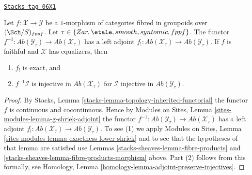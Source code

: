 \begin{lemma}
\label{stacks-sheaves-lemma-pullback-injective}
\href{https://stacks.math.columbia.edu/tag/06X1}{\texttt{Stacks tag 06X1}}

Let $f : \mathcal{X} \to \mathcal{Y}$ be a $1$-morphism of categories
fibred in groupoids over $(\Sch/S)_{fppf}$. Let
$\tau \in \{Zar, \etale, smooth, syntomic, fppf\}$.
The functor
$f^{-1} : \textit{Ab}(\mathcal{Y}_\tau) \to \textit{Ab}(\mathcal{X}_\tau)$
has a left adjoint
$f_! : \textit{Ab}(\mathcal{X}_\tau) \to \textit{Ab}(\mathcal{Y}_\tau)$.
If $f$ is faithful and $\mathcal{X}$ has equalizers, then
\begin{enumerate}
\item $f_!$ is exact, and
\item $f^{-1}\mathcal{I}$ is injective in $\textit{Ab}(\mathcal{X}_\tau)$
for $\mathcal{I}$ injective in $\textit{Ab}(\mathcal{Y}_\tau)$.
\end{enumerate}
\end{lemma}

\begin{proof}
By
Stacks, Lemma \ref{stacks-lemma-topology-inherited-functorial}
the functor $f$ is continuous and cocontinuous. Hence by
Modules on Sites, Lemma \ref{sites-modules-lemma-g-shriek-adjoint}
the functor
$f^{-1} : \textit{Ab}(\mathcal{Y}_\tau) \to \textit{Ab}(\mathcal{X}_\tau)$
has a left adjoint
$f_! : \textit{Ab}(\mathcal{X}_\tau) \to \textit{Ab}(\mathcal{Y}_\tau)$.
To see (1) we apply
Modules on Sites, Lemma \ref{sites-modules-lemma-exactness-lower-shriek}
and to see that the hypotheses of that lemma are satisfied use
Lemmas \ref{stacks-sheaves-lemma-fibre-products} and
\ref{stacks-sheaves-lemma-fibre-products-morphism}
above. Part (2) follows from this formally, see
Homology, Lemma \ref{homology-lemma-adjoint-preserve-injectives}.
\end{proof}

